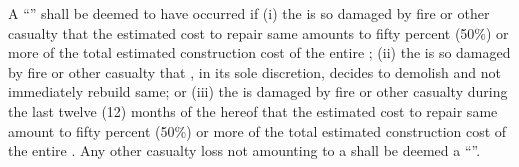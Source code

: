 A ``'' shall be deemed to have occurred if (i) the \building is so damaged by fire or other casualty that the estimated cost to repair same amounts to fifty percent (50\%) or more of the total estimated construction cost of the entire \building; (ii) the \building is so damaged by fire or other casualty that \lessor, in its sole discretion, decides to demolish and not immediately rebuild same; or (iii) the \premises is damaged by fire or other casualty during the last twelve (12) months of the \termOfLease hereof that the estimated cost to repair same amount to fifty percent (50\%) or more of the total estimated construction cost of the entire \premises. Any other casualty loss not amounting to a \totalLoss shall be deemed a ``''.
